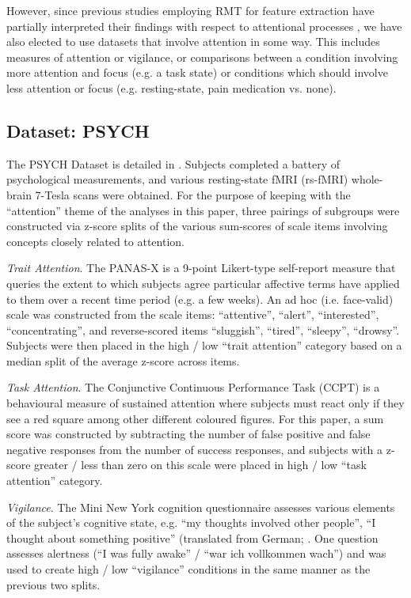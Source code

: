 \documentclass[12pt]{spieman}  %
\begin{document}
\begin{spacing}{2}
However, since previous studies employing RMT for feature extraction have partially interpreted
their findings with respect to attentional processes
\cite{wangRandomMatrixTheory2016,matharooSpontaneousBackpainAlters2020}, we have also elected to use
datasets that involve attention in some way. This includes measures of attention or vigilance, or
comparisons between a condition involving more attention and focus (e.g. a task state) or conditions
which should involve less attention or focus (e.g. resting-state, pain medication vs. none).

\subsection{Dataset: PSYCH}
The PSYCH Dataset  is detailed in \cite{gorgolewskiHighResolution7Tesla2015}. Subjects completed a
battery of psychological measurements, and various resting-state fMRI (rs-fMRI) whole-brain 7-Tesla
scans were obtained. For the purpose of keeping with the ``attention'' theme of the analyses in this
paper, three pairings of subgroups were constructed via z-score splits of the various sum-scores of
scale items involving concepts closely related to attention.

\emph{Trait Attention}.
The PANAS-X \cite{watsonPANASXManualPositive1994} is a 9-point Likert-type self-report measure that
queries the extent to which subjects agree particular affective terms have applied to them over a
recent time period (e.g. a few weeks). An ad hoc (i.e. face-valid) scale was constructed from the
scale items: ``attentive'', ``alert'', ``interested'', ``concentrating'', and reverse-scored items
``sluggish'', ``tired'', ``sleepy'', ``drowsy''. Subjects were then placed in the high / low ``trait
attention'' category based on a median split of the average z-score across items.

\emph{Task Attention}.
The Conjunctive Continuous Performance Task \cite{shalevConjunctiveContinuousPerformance2011} (CCPT)
 is a behavioural measure of sustained attention
where subjects must react only if they see a red square among other different coloured figures. For
this paper, a sum score was constructed by subtracting the number of false positive and false
negative responses from the number of success responses, and subjects with a z-score greater / less
than zero on this scale were placed in high / low ``task attention'' category.

\emph{Vigilance}.
The Mini New York cognition questionnaire assesses various elements of the subject's cognitive
state, e.g. ``my thoughts involved other people'', ``I thought about something positive'' (translated
from German; \cite{gorgolewskiCorrespondenceIndividualDifferences2014}. One question assesses
alertness (``I was fully awake'' / ``war ich vollkommen wach'') and was used to create high / low
``vigilance'' conditions in the same manner as the previous two splits.


\end{spacing}
\end{document}
